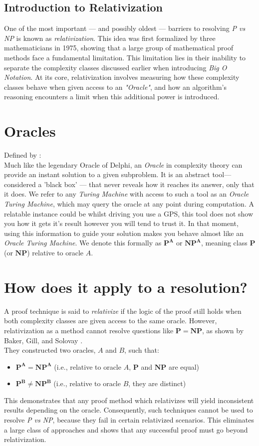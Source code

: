 \documentclass[12pt]{report}
\begin{document}
\subsection{Introduction to Relativization}
One of the most important --- and possibly oldest --- barriers to resolving \textit{P vs NP} is known as \textit{relativization}.
This idea was first formalized by three mathematicians in 1975, showing that a large group of mathematical proof methods face a fundamental limitation.
This limitation lies in their inability to separate the complexity classes discussed earlier when introducing \textit{Big O Notation}.
At its core, relativization involves measuring how these complexity classes behave when given access to an \textit{"Oracle"}, and how an algorithm's reasoning encounters a limit when this additional power is introduced.

\section{Oracles}
Defined by \cite{arora2009}:\\
Much like the legendary Oracle of Delphi, an \textit{Oracle} in complexity theory can provide an instant solution to a given subproblem.
It is an abstract tool—considered a 'black box' --- that never reveals how it reaches its answer, only that it does.
We refer to any \textit{Turing Machine} with access to such a tool as an \textit{Oracle Turing Machine}, which may query the oracle at any point during computation.
A relatable instance could be whilst driving you use a GPS, this tool does not show you how it gets it's result however you will tend to trust it.
In that moment, using this information to guide your solution makes you behave almost like an \textit{Oracle Turing Machine}.
We denote this formally as $\mathbf{P^A}$ or $\mathbf{NP^A}$, meaning class $\mathbf{P}$ (or $\mathbf{NP}$) relative to oracle $A$.

\section{How does it apply to a resolution?}
A proof technique is said to \textit{relativize} if the logic of the proof still holds when both complexity classes are given access to the same oracle.
However, relativization as a method cannot resolve questions like $\mathbf{P = NP}$, as shown by Baker, Gill, and Solovay \cite{baker1975relativizations}.\\
They constructed two oracles, $A$ and $B$, such that:
\begin{itemize}
    \item $\mathbf{P^A = NP^A}$ (i.e., relative to oracle $A$, $\mathbf{P}$ and $\mathbf{NP}$ are equal)
    \item $\mathbf{P^B \neq NP^B}$ (i.e., relative to oracle $B$, they are distinct)
\end{itemize}
This demonstrates that any proof method which relativizes will yield inconsistent results depending on the oracle.
Consequently, such techniques cannot be used to resolve \textit{P vs NP}, because they fail in certain relativized scenarios.
This eliminates a large class of approaches and shows that any successful proof must go beyond relativization.
\end{document}
